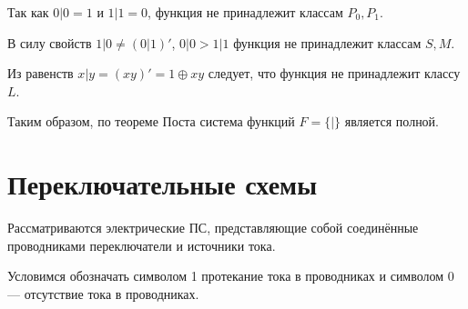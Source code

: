 Так как $0|0=1$ и $1|1=0$, функция не принадлежит классам $P_0, P_1$.

В силу свойств $1|0 \neq (0|1)'$, $0|0>1|1$ функция не принадлежит классам $S, M$.

Из равенств $x|y=(xy)'=1\oplus xy$ следует, что функция не принадлежит классу $L$.

Таким образом, по теореме Поста система функций $F=\{|\}$ является полной.

\section{Переключательные схемы}
Рассматриваются электрические ПС, представляющие собой соединённые проводниками переключатели и источники тока.

Условимся обозначать символом 1 протекание тока в проводниках и символом 0 --- отсутствие тока в проводниках.

